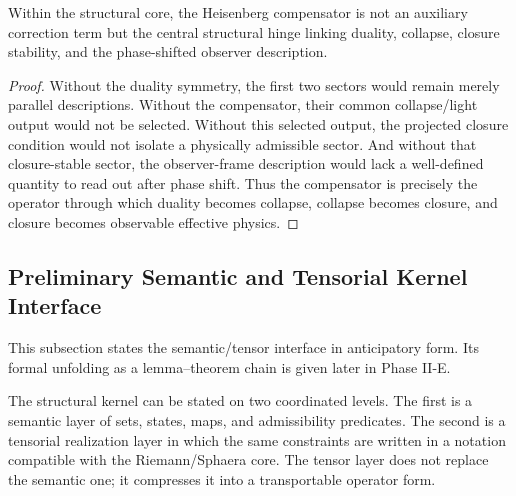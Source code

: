 \begin{proposition}
\label{prop:hc-centrality}
Within the structural core, the Heisenberg compensator is not an auxiliary
correction term but the central structural hinge linking duality, collapse,
closure stability, and the phase-shifted observer description.
\end{proposition}

\begin{proof}
Without the duality symmetry, the first two sectors would remain merely
parallel descriptions. Without the compensator, their common collapse/light
output would not be selected. Without this selected output, the projected
closure condition would not isolate a physically admissible sector. And
without that closure-stable sector, the observer-frame description would lack a
well-defined quantity to read out after phase shift. Thus the compensator is
precisely the operator through which duality becomes collapse, collapse becomes
closure, and closure becomes observable effective physics.
\end{proof}


\subsection*{Preliminary Semantic and Tensorial Kernel Interface}

This subsection states the semantic/tensor interface in anticipatory form. Its formal unfolding as a lemma--theorem chain is given later in Phase II-E.

The structural kernel can be stated on two coordinated levels. The first is a
semantic layer of sets, states, maps, and admissibility predicates. The second
is a tensorial realization layer in which the same constraints are written in a
notation compatible with the Riemann/Sphaera core. The tensor layer does not
replace the semantic one; it compresses it into a transportable operator form.

